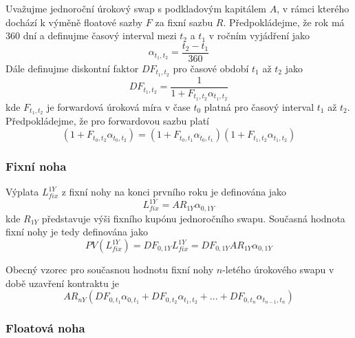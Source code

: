 \documentclass[a4paper]{book}
\begin{document}
Uvažujme jednoroční úrokový swap s podkladovým kapitálem $A$, v rámci kterého dochází k výměně floatové sazby $F$ za fixní sazbu $R$. Předpokládejme, že rok má 360 dní a definujme časový interval mezi $t_2$ a $t_1$ v ročním vyjádření jako 
\begin{equation*}
\alpha_{t_1, t_2} = \frac{t_2 - t_1}{360}
\end{equation*}
Dále definujme diskontní faktor $DF_{t_1, t_2}$ pro časové období $t_1$ až $t_2$ jako
\begin{equation*}
DF_{t_1, t_2} = \frac{1}{1 + F_{t_1, t_2} \alpha_{t_1, t_2}}
\end{equation*}
kde $F_{t_1, t_2}$ je forwardová úroková míra v čase $t_0$ platná pro časový interval $t_1$ až $t_2$. Předpokládejme, že pro forwardovou sazbu platí
\begin{equation*}
(1 + F_{t_0, t_2} \alpha_{t_0, t_2})  = (1 + F_{t_0, t_1} \alpha_{t_0, t_1})(1 + F_{t_1, t_2} \alpha_{t_1, t_2})
\end{equation*}

\subsubsection{Fixní noha}

Výplata $L_{fix}^{1Y}$ z fixní nohy na konci prvního roku je definována jako
\begin{equation*}
L_{fix}^{1Y} = A R_{1Y} \alpha_{0,1Y}
\end{equation*}
kde $R_{1Y}$ představuje výši fixního kupónu jednoročního swapu. Současná hodnota fixní nohy je tedy definována jako
\begin{equation*}
PV(L_{fix}^{1Y}) = DF_{0, 1Y} L_{fix}^{1Y} =  DF_{0, 1Y} A R_{1Y} \alpha_{0,1Y}
\end{equation*}

Obecný vzorec pro současnou hodnotu fixní nohy $n$-letého úrokového swapu v době uzavření kontraktu je
\begin{equation}
AR_{nY}(DF_{0,t_1} \alpha_{0,t_1} + DF_{0, t_2} \alpha_{t_1,t_2} + ... + DF_{0, t_n} \alpha_{t_{n-1},t_n})
\end{equation}

\subsubsection{Floatová noha}
\end{document}

